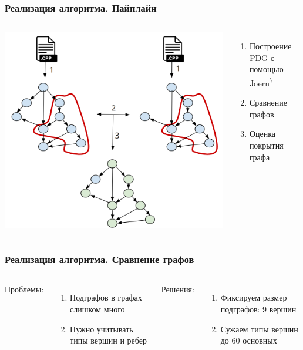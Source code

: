 \documentclass[10pt]{beamer}
\begin{document}
\begin{frame}[fragile]\frametitle{Реализация алгоритма. Пайплайн}
	\begin{columns}
		\hspace*{-0.6cm}\includegraphics[scale=0.6]{algo.png}
		\centering
		\begin{enumerate}
			\item Построение PDG с помощью Joern\textsuperscript{7}
			\newline
			\item Сравнение графов
			\newline
			\newline
			\item Оценка покрытия графа
		\end{enumerate}
	    \vspace{2cm}
	\end{columns}
\end{frame}
    
\begin{frame}\frametitle{Реализация алгоритма. Сравнение графов}
	\begin{columns}[T]
	\column{0.5\textwidth}
	    Проблемы:
		\begin{enumerate}
		\item Подграфов в графах слишком много
		\item Нужно учитывать типы вершин и ребер
		\end{enumerate}
	
	\column{.02\textwidth}
	
	\column{0.5\textwidth}
	Решения:
	\begin{enumerate}
	\item Фиксируем размер подграфов: 9 вершин
	\item Сужаем типы вершин до 60 основных
	\end{enumerate}
	\end{columns}
\end{frame}
\end{document}
